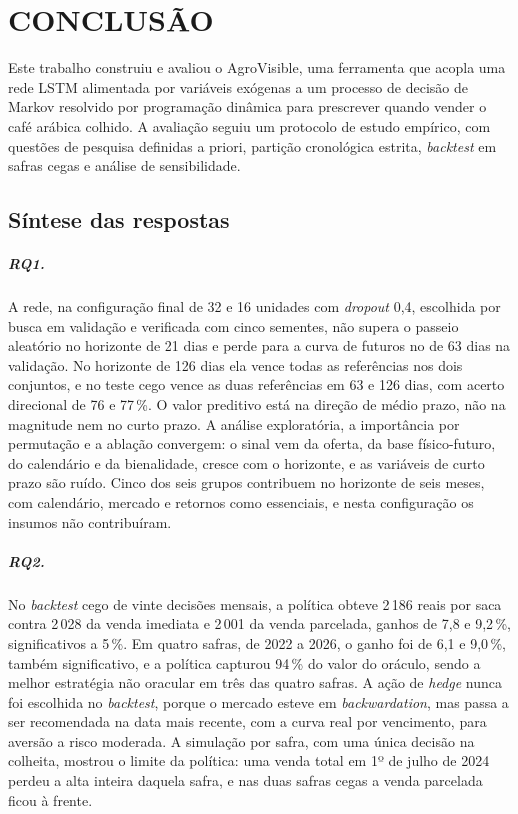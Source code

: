 \chapter{\MakeUppercase{Conclusão}}\label{sec:conclusao}

Este trabalho construiu e avaliou o AgroVisible, uma ferramenta que acopla uma rede LSTM alimentada por variáveis exógenas a um processo de decisão de Markov resolvido por programação dinâmica para prescrever quando vender o café arábica colhido. A avaliação seguiu um protocolo de estudo empírico, com questões de pesquisa definidas a priori, partição cronológica estrita, \textit{backtest} em safras cegas e análise de sensibilidade.

\section{Síntese das respostas}

\paragraph{RQ1.} A rede, na configuração final de 32 e 16 unidades com \textit{dropout} 0,4, escolhida por busca em validação e verificada com cinco sementes, não supera o passeio aleatório no horizonte de 21 dias e perde para a curva de futuros no de 63 dias na validação. No horizonte de 126 dias ela vence todas as referências nos dois conjuntos, e no teste cego vence as duas referências em 63 e 126 dias, com acerto direcional de 76 e 77\,\%. O valor preditivo está na direção de médio prazo, não na magnitude nem no curto prazo. A análise exploratória, a importância por permutação e a ablação convergem: o sinal vem da oferta, da base físico-futuro, do calendário e da bienalidade, cresce com o horizonte, e as variáveis de curto prazo são ruído. Cinco dos seis grupos contribuem no horizonte de seis meses, com calendário, mercado e retornos como essenciais, e nesta configuração os insumos não contribuíram.

\paragraph{RQ2.} No \textit{backtest} cego de vinte decisões mensais, a política obteve 2\,186 reais por saca contra 2\,028 da venda imediata e 2\,001 da venda parcelada, ganhos de 7,8 e 9,2\,\%, significativos a 5\,\%. Em quatro safras, de 2022 a 2026, o ganho foi de 6,1 e 9,0\,\%, também significativo, e a política capturou 94\,\% do valor do oráculo, sendo a melhor estratégia não oracular em três das quatro safras. A ação de \textit{hedge} nunca foi escolhida no \textit{backtest}, porque o mercado esteve em \textit{backwardation}, mas passa a ser recomendada na data mais recente, com a curva real por vencimento, para aversão a risco moderada. A simulação por safra, com uma única decisão na colheita, mostrou o limite da política: uma venda total em 1º de julho de 2024 perdeu a alta inteira daquela safra, e nas duas safras cegas a venda parcelada ficou à frente.


